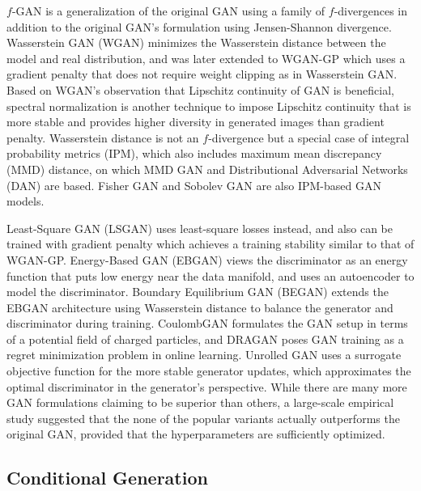 $f$-GAN \cite{nowozin2016fgan} is a generalization of the original GAN using a family of $f$-divergences in addition to the original GAN's formulation using Jensen-Shannon divergence.
Wasserstein GAN (WGAN) \cite{arjovsky2017wgan} minimizes the Wasserstein distance between the model and real distribution, and was later extended to WGAN-GP \cite{gulrajani2017wgan} which uses a gradient penalty that does not require weight clipping as in Wasserstein GAN.
Based on WGAN's observation that Lipschitz continuity of GAN is beneficial, spectral normalization \cite{miyato2018spectral} is another technique to impose Lipschitz continuity that is more stable and provides higher diversity in generated images than gradient penalty.
Wasserstein distance is not an $f$-divergence but a special case of integral probability metrics (IPM), which also includes maximum mean discrepancy (MMD) distance, on which MMD GAN \cite{li2017mmdgan} and Distributional Adversarial Networks (DAN) \cite{li2017dan} are based.
Fisher GAN \cite{mroueh2017fishergan} and Sobolev GAN \cite{mroueh2018gan} are also IPM-based GAN models.

Least-Square GAN (LSGAN) \cite{mao2017lsgan} uses least-square losses instead, and also can be trained with gradient penalty \cite{mao2017effectiveness} which achieves a training stability similar to that of WGAN-GP.
Energy-Based GAN (EBGAN) \cite{zhao2017ebgan} views the discriminator as an energy function that puts low energy near the data manifold, and uses an autoencoder to model the discriminator. Boundary Equilibrium GAN (BEGAN) \cite{berthelot2017began} extends the EBGAN architecture using Wasserstein distance to balance the generator and discriminator during training.
CoulombGAN \cite{unterthiner2017coulomb} formulates the GAN setup in terms of a potential field of charged particles, and DRAGAN \cite{kodali2017gan} poses GAN training as a regret minimization problem in online learning.
Unrolled GAN \cite{metz2016unrolled} uses a surrogate objective function for the more stable generator updates, which approximates the optimal discriminator in the generator's perspective.
While there are many more GAN formulations claiming to be superior than others, a large-scale empirical study \cite{lucic2017gan} suggested that the none of the popular variants actually outperforms the original GAN, provided that the hyperparameters are sufficiently optimized.


\subsection{Conditional Generation}

